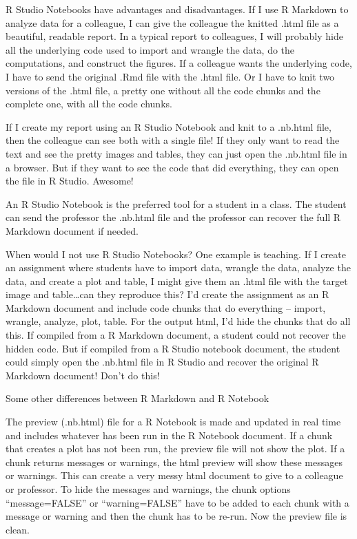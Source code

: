 \documentclass[]{book}
\begin{document}
R Studio Notebooks have advantages and disadvantages. If I use R Markdown to analyze data for a colleague, I can give the colleague the knitted .html file as a beautiful, readable report. In a typical report to colleagues, I will probably hide all the underlying code used to import and wrangle the data, do the computations, and construct the figures. If a colleague wants the underlying code, I have to send the original .Rmd file with the .html file. Or I have to knit two versions of the .html file, a pretty one without all the code chunks and the complete one, with all the code chunks.

If I create my report using an R Studio Notebook and knit to a .nb.html file, then the colleague can see both with a single file! If they only want to read the text and see the pretty images and tables, they can just open the .nb.html file in a browser. But if they want to see the code that did everything, they can open the file in R Studio. Awesome!

An R Studio Notebook is the preferred tool for a student in a class. The student can send the professor the .nb.html file and the professor can recover the full R Markdown document if needed.

When would I not use R Studio Notebooks? One example is teaching. If I create an assignment where students have to import data, wrangle the data, analyze the data, and create a plot and table, I might give them an .html file with the target image and table\ldots can they reproduce this? I'd create the assignment as an R Markdown document and include code chunks that do everything -- import, wrangle, analyze, plot, table. For the output html, I'd hide the chunks that do all this. If compiled from a R Markdown document, a student could not recover the hidden code. But if compiled from a R Studio notebook document, the student could simply open the .nb.html file in R Studio and recover the original R Markdown document! Don't do this!

Some other differences between R Markdown and R Notebook

The preview (.nb.html) file for a R Notebook is made and updated in real time and includes whatever has been run in the R Notebook document. If a chunk that creates a plot has not been run, the preview file will not show the plot. If a chunk returns messages or warnings, the html preview will show these messages or warnings. This can create a very messy html document to give to a colleague or professor. To hide the messages and warnings, the chunk options ``message=FALSE'' or ``warning=FALSE'' have to be added to each chunk with a message or warning and then the chunk has to be re-run. Now the preview file is clean.
\end{document}
